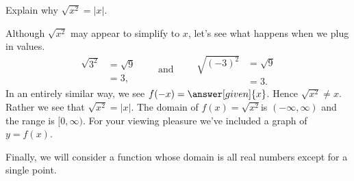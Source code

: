 \documentclass{ximera}
\begin{document}
\begin{example}
  Explain why $\sqrt{x^2} = |x|$.
  \begin{explanation}
    Although $\sqrt{x^2}$ may appear to simplify to $x$, let's see
    what happens when we plug in values.
    \[
    \begin{aligned}
    \sqrt{3^2} &= \sqrt{9}\\
    &=3,
    \end{aligned}
    \qquad\text{and}\qquad
    \begin{aligned}
      \sqrt{(-3)^2} &= \sqrt{9}\\
      &=3.
    \end{aligned}
    \]
    In an entirely similar way, we see $f(-x)=\answer[given]{x}$.  Hence
    $\sqrt{x^2}\ne x$. Rather we see that $\sqrt{x^2} = |x|$.  The
    domain of $f(x)=\sqrt{x^2}$is $(-\infty,\infty)$ and the range is
    $[0,\infty)$.  For your viewing pleasure we've included a graph of
      $y=f(x)$.
    \begin{image}
    \end{image}
  \end{explanation}
\end{example}

Finally, we will consider a function whose domain is all real numbers
except for a single point.
\end{document}
